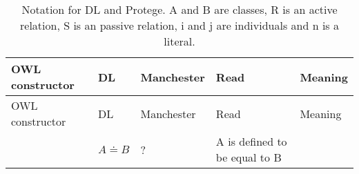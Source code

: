\documentclass[a4paper,]{report}
\begin{document}
\begin{longtable}[]{@{}lllll@{}}
\caption{Notation for DL and Protege. A and B are classes, R is an
active relation, S is an passive relation, i and j are individuals and n
is a literal.}\tabularnewline
\toprule
\begin{minipage}[b]{0.18\columnwidth}\raggedright
OWL constructor\strut
\end{minipage} & \begin{minipage}[b]{0.16\columnwidth}\raggedright
DL\strut
\end{minipage} & \begin{minipage}[b]{0.17\columnwidth}\raggedright
Manchester\strut
\end{minipage} & \begin{minipage}[b]{0.20\columnwidth}\raggedright
Read\strut
\end{minipage} & \begin{minipage}[b]{0.14\columnwidth}\raggedright
Meaning\strut
\end{minipage}\tabularnewline
\midrule
\endfirsthead
\toprule
\begin{minipage}[b]{0.18\columnwidth}\raggedright
OWL constructor\strut
\end{minipage} & \begin{minipage}[b]{0.16\columnwidth}\raggedright
DL\strut
\end{minipage} & \begin{minipage}[b]{0.17\columnwidth}\raggedright
Manchester\strut
\end{minipage} & \begin{minipage}[b]{0.20\columnwidth}\raggedright
Read\strut
\end{minipage} & \begin{minipage}[b]{0.14\columnwidth}\raggedright
Meaning\strut
\end{minipage}\tabularnewline
\midrule
\endhead
\begin{minipage}[t]{0.18\columnwidth}\raggedright
\strut
\end{minipage} & \begin{minipage}[t]{0.16\columnwidth}\raggedright
\(A\doteq B\)\strut
\end{minipage} & \begin{minipage}[t]{0.17\columnwidth}\raggedright
?\strut
\end{minipage} & \begin{minipage}[t]{0.20\columnwidth}\raggedright
A is defined to be equal to B\strut
\end{minipage} & \begin{minipage}[t]{0.14\columnwidth}\raggedright

\end{minipage}
\end{longtable}
\end{document}
